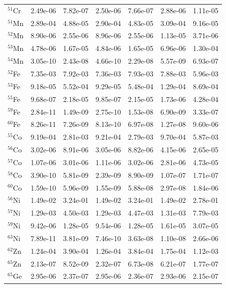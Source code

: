 \begin{table}
\begin{tabular}{l|cc|cc|cc}
$^{51}$Cr & 2.49e-06 & 7.82e-07 & 2.50e-06 & 7.66e-07 & 2.88e-06 & 1.11e-05\\
$^{51}$Mn & 2.89e-04 & 4.88e-05 & 2.90e-04 & 4.83e-05 & 3.09e-04 & 9.16e-05\\
$^{52}$Mn & 8.90e-06 & 2.55e-06 & 8.96e-06 & 2.55e-06 & 1.13e-05 & 3.71e-06\\
$^{53}$Mn & 4.78e-06 & 1.67e-05 & 4.84e-06 & 1.65e-05 & 6.96e-06 & 1.30e-04\\
$^{54}$Mn & 3.05e-10 & 2.43e-08 & 4.66e-10 & 2.29e-08 & 5.57e-09 & 6.93e-07\\
$^{52}$Fe & 7.35e-03 & 7.92e-03 & 7.36e-03 & 7.93e-03 & 7.88e-03 & 5.96e-03\\
$^{53}$Fe & 9.18e-05 & 5.52e-04 & 9.29e-05 & 5.48e-04 & 1.29e-04 & 8.69e-04\\
$^{55}$Fe & 9.68e-07 & 2.18e-05 & 9.85e-07 & 2.15e-05 & 1.73e-06 & 4.28e-04\\
$^{59}$Fe & 2.84e-11 & 1.49e-09 & 2.75e-10 & 1.53e-08 & 6.90e-09 & 3.33e-07\\
$^{60}$Fe & 8.26e-11 & 7.26e-09 & 8.13e-10 & 6.97e-08 & 1.27e-08 & 9.60e-06\\
$^{55}$Co & 9.19e-04 & 2.81e-03 & 9.21e-04 & 2.79e-03 & 9.70e-04 & 5.87e-03\\
$^{56}$Co & 3.02e-06 & 8.91e-06 & 3.05e-06 & 8.82e-06 & 4.15e-06 & 2.65e-05\\
$^{57}$Co & 1.07e-06 & 3.01e-06 & 1.11e-06 & 3.02e-06 & 2.81e-06 & 4.73e-05\\
$^{58}$Co & 3.90e-10 & 5.81e-09 & 2.39e-09 & 8.90e-09 & 1.07e-07 & 1.71e-07\\
$^{60}$Co & 1.59e-10 & 5.96e-09 & 1.55e-09 & 5.88e-08 & 2.97e-08 & 1.84e-06\\
$^{56}$Ni & 1.49e-02 & 3.24e-01 & 1.49e-02 & 3.24e-01 & 1.49e-02 & 2.78e-01\\
$^{57}$Ni & 1.29e-03 & 4.50e-03 & 1.29e-03 & 4.47e-03 & 1.31e-03 & 7.79e-03\\
$^{59}$Ni & 9.42e-06 & 1.28e-05 & 9.54e-06 & 1.28e-05 & 1.61e-05 & 3.07e-05\\
$^{63}$Ni & 7.89e-11 & 3.81e-09 & 7.46e-10 & 3.63e-08 & 1.10e-08 & 2.66e-06\\
$^{62}$Zn & 1.24e-04 & 3.90e-04 & 1.26e-04 & 3.84e-04 & 1.75e-04 & 1.12e-03\\
$^{65}$Zn & 2.13e-07 & 8.52e-09 & 2.32e-07 & 6.73e-08 & 6.21e-07 & 1.77e-07\\
$^{65}$Ge & 2.95e-06 & 2.37e-07 & 2.95e-06 & 2.36e-07 & 2.93e-06 & 2.15e-07\\
\hline
\end{tabular}
\end{table}
